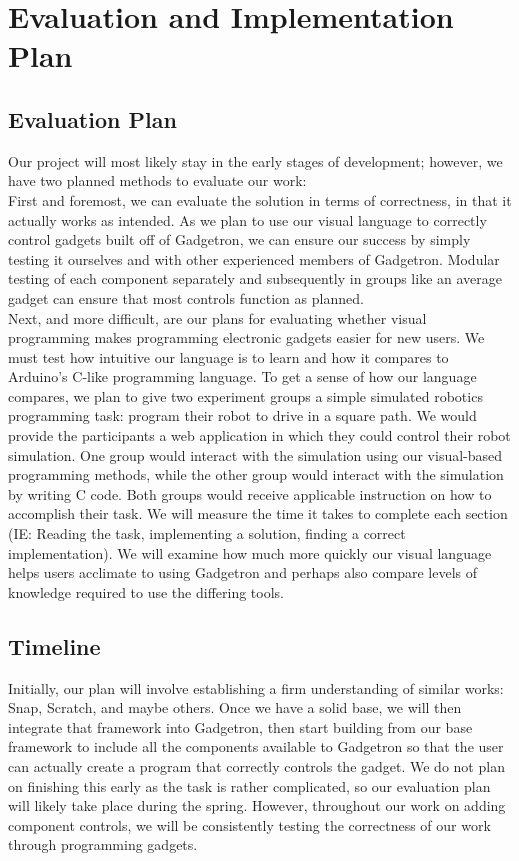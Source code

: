 \documentclass[12pt]{article}
\begin{document}
\section{Evaluation and Implementation Plan}

\subsection{Evaluation Plan}
Our project will most likely stay in the early stages of development; however, we have two planned methods to evaluate our work:\\[7pt]
First and foremost, we can evaluate the solution in terms of correctness, in that it actually works as intended. As we plan to use our visual language to correctly control gadgets built off of Gadgetron, we can ensure our success by simply testing it ourselves and with other experienced members of Gadgetron. Modular testing of each component separately and subsequently in groups like an average gadget can ensure that most controls function as planned.\\[7pt]
Next, and more difficult, are our plans for evaluating whether visual programming makes programming electronic gadgets easier for new users. We must test how intuitive our language is to learn and how it compares to Arduino's C-like programming language. To get a sense of how our language compares, we plan to give two experiment groups a simple simulated robotics programming task: program their robot to drive in a square path. We would provide the participants a web application in which they could control their robot simulation. One group would interact with the simulation using our visual-based programming methods, while the other group would interact with the simulation by writing C code. Both groups would receive applicable instruction on how to accomplish their task. We will measure the time it takes to complete each section (IE: Reading the task, implementing a solution, finding a correct implementation). We will examine how much more quickly our visual language helps users acclimate to using Gadgetron and perhaps also compare levels of knowledge required to use the differing tools.

\subsection{Timeline}
Initially, our plan will involve establishing a firm understanding of similar works: Snap, Scratch, and maybe others. Once we have a solid base, we will then integrate that framework into Gadgetron, then start building from our base framework to include all the components available to Gadgetron so that the user can actually create a program that correctly controls the gadget. We do not plan on finishing this early as the task is rather complicated, so our evaluation plan will likely take place during the spring. However, throughout our work on adding component controls, we will be consistently testing the correctness of our work through programming gadgets.



\end{document}
